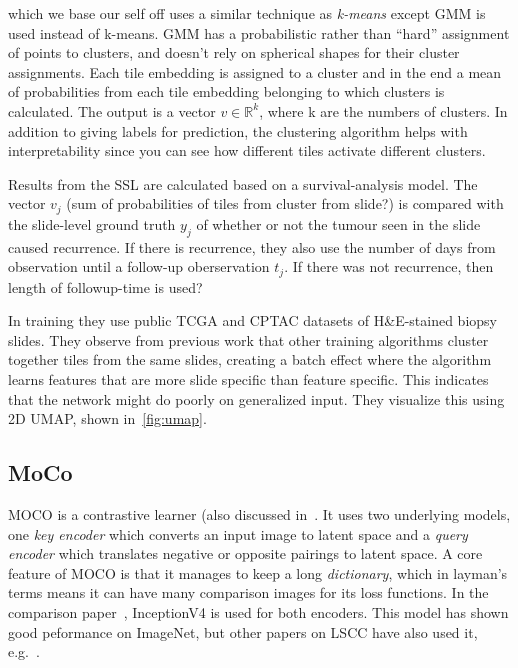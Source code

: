 \documentclass[10pt,twocolumn,letterpaper]{article}
\begin{document}
\cite{sslUMAP} which we base our self off uses a similar technique as \textit{k-means} except \gls{GMM} is used instead of k-means. \gls{GMM} has a probabilistic rather than ``hard'' assignment of points to clusters, and doesn't rely on spherical shapes for their cluster assignments. Each tile embedding is assigned to a cluster and in the end a mean of probabilities from each tile embedding belonging to which clusters is calculated. The output is a vector $v \in \mathbb{R}^{k}$, where k are the numbers of clusters. 
In addition to giving labels for prediction, the clustering algorithm helps with interpretability since you can see how different tiles activate different clusters.

Results from the \gls{SSL} are calculated based on a survival-analysis model. The vector $v_{j}$ (sum of probabilities of tiles from cluster from slide?) is compared with the slide-level ground truth $y_{j}$ of whether or not the tumour seen in the slide caused recurrence. If there is recurrence, they also use the number of days from observation until a follow-up oberservation $t_{j}$. If there was not recurrence, then length of followup-time is used? %


In training they use public TCGA and CPTAC datasets of H\&E-stained biopsy slides. They observe from previous work that other training algorithms cluster together tiles from the same slides, creating a batch effect where the algorithm learns features that are more slide specific than feature specific. This indicates that the network might do poorly on generalized input. They visualize this using 2D \gls{UMAP}, shown in~\cref{fig:umap}.

\subsection{MoCo}\label{subsec:moco}
\gls{MOCO}\cite{moco} is a contrastive learner (also discussed in~. It uses two underlying models, one \textit{key encoder} which converts an input image to latent space and a \textit{query encoder} which translates negative or opposite pairings to latent space. A core feature of \gls{MOCO} is that it manages to keep a long \textit{dictionary}, which in layman's terms means it can have many comparison images for its loss functions. In the comparison paper~\cite{sslUMAP}, InceptionV4\cite{inceptionV4} is used for both encoders. This model has shown good peformance on ImageNet, but other papers on \gls{LSCC} have also used it, e.g.~\cite{otherInception}.
\end{document}

